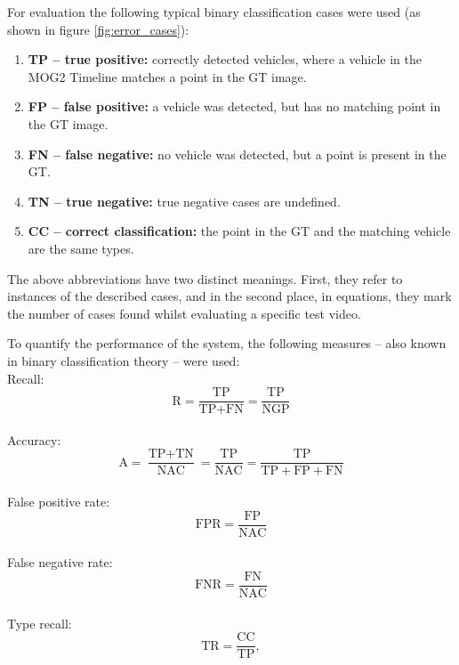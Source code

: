 For evaluation the following typical binary classification cases were used (as shown in figure \ref{fig:error_cases}):
\begin{enumerate}
\item \textbf{TP -- true positive:} correctly detected vehicles, where a vehicle in the MOG2 Timeline matches a point in the GT image.
\item \textbf{FP -- false positive:} a vehicle was detected, but has no matching point in the GT image.
\item \textbf{FN -- false negative:} no vehicle was detected, but a point is present in the GT. 
\item \textbf{TN -- true negative:} true negative cases are undefined.
\item  \textbf{CC -- correct classification:} the point in the GT and the matching vehicle are the same types.
\end{enumerate}

The above abbreviations have two distinct meanings. 
First, they refer to instances of the described cases, and in the second place, in equations, they mark the number of cases found whilst evaluating a specific test video.

To quantify the performance of the system, the following measures -- also known in binary classification theory -- were used:
\\[5pt]
\noindent Recall:
\begin{displaymath}
\text{R} = \frac{\text{TP}}{\text{TP}+\text{FN}} = \frac{\text{TP}}{\text{NGP}}
\end{displaymath}
\\[5pt]
\noindent Accuracy:
\begin{displaymath}
\text{A} = \frac{\text{TP}+\text{TN}}{\text{NAC}} = \frac{\text{TP}}{\text{NAC}} = \frac{\text{TP}}{\text{TP}+\text{FP}+\text{FN}}
\end{displaymath}
\\[5pt]
\noindent False positive rate:
\begin{displaymath}
\text{FPR} = \frac{\text{FP}}{\text{NAC}}
\end{displaymath}
\\[5pt]
\noindent False negative rate:
\begin{displaymath}
\text{FNR} = \frac{\text{FN}}{\text{NAC}}
\end{displaymath}
\\[5pt]
\noindent Type recall:
\begin{displaymath}
\text{TR} = \frac{\text{CC}}{\text{TP}},
\end{displaymath}


